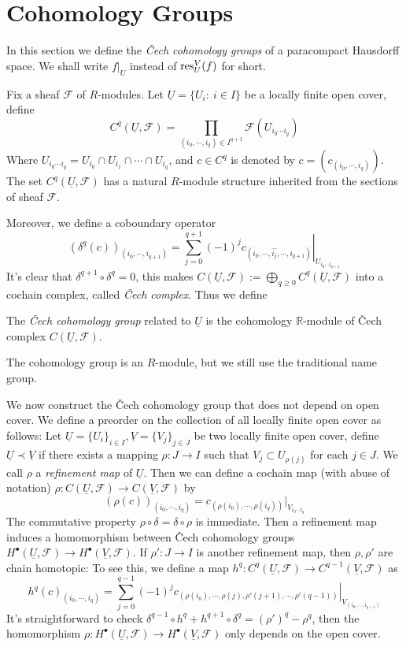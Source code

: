 \section{Cohomology Groups}

In this section we define the \emph{\v{C}ech cohomology groups} of a paracompact Hausdorff space.
We shall write $f|_U$ instead of $\operatorname{res}^V_U(f)$ for short.

Fix a sheaf $\mathcal{F}$ of $R$-modules.
Let $\underline{U}=\{U_i:\ i\in I\}$ be a locally finite open cover, define
\[C^q(\underline{U},\mathcal{F})=\prod_{(i_0,\cdots,i_q)\in I^{q+1}}\mathcal{F}(U_{i_0\cdots i_q})\]
Where $U_{i_0\cdots i_q}=U_{i_0}\cap U_{i_1}\cap\cdots\cap U_{i_q}$, and $c\in C^q$ is denoted by $c=\left(c_{(i_0,\cdots,i_q)}\right)$.
The set $C^q(\underline{U},\mathcal{F})$ has a natural $R$-module structure inherited from the sections of sheaf $\mathcal{F}$.

Moreover, we define a coboundary operator
\[(\delta^q(c))_{(i_0,\cdots,i_{q+1})}=\sum_{j=0}^{q+1}(-1)^j\left.c_{(i_0,\cdots,\widehat{i_j},\cdots,i_{q+1})}\right|_{U_{i_0\cdots i_{q+1}}}\]
It's clear that $\delta^{q+1}\circ\delta^q=0$, this makes $C(\underline{U},\mathcal{F}):=\bigoplus_{q\geq 0}C^q(\underline{U},\mathcal{F})$ into a cochain complex, called \emph{\v{C}ech complex}.
Thus we define

\begin{defn}
    The \emph{\v{C}ech cohomology group} related to $\underline{U}$ is the cohomology $\mathbb{R}$-module of \v{C}ech complex $C(\underline{U},\mathcal{F})$.
\end{defn}

The cohomology group is an $R$-module, but we still use the traditional name group.

We now construct the \v{C}ech cohomology group that does not depend on open cover.
We define a preorder on the collection of all locally finite open cover as follows:
Let $\underline{U}=\{U_i\}_{i\in I},\underline{V}=\{V_j\}_{j\in J}$ be two locally finite open cover, define $\underline{U}\prec\underline{V}$ if there exists a mapping $\rho:J\to I$ such that $V_j\subset U_{\rho(j)}$ for each $j\in J$.
We call $\rho$ a \emph{refinement map} of $\underline{U}$.
Then we can define a cochain map (with abuse of notation) $\rho:C(\underline{U},\mathcal{F})\to C(\underline{V},\mathcal{F})$ by
\[(\rho(c))_{(i_0,\cdots,i_q)}=c_{(\rho(i_0),\cdots,\rho(i_q))}|_{V_{i_0\cdots i_q}}\]
The commutative property $\rho\circ\delta=\delta\circ\rho$ is immediate.
Then a refinement map induces a homomorphism between \v{C}ech cohomology groups $H^\bullet(\underline{U},\mathcal{F})\to H^\bullet(\underline{V},\mathcal{F})$.
If $\rho':J\to I$ is another refinement map, then $\rho,\rho'$ are chain homotopic:
To see this, we define a map $h^q:C^q(\underline{U},\mathcal{F})\to C^{q-1}(\underline{V},\mathcal{F})$ as
\[h^q(c)_{(i_0,\cdots,i_q)}=\sum_{j=0}^{q-1}(-1)^j\left.c_{(\rho(i_0),\cdots,\rho(j),\rho'(j+1),\cdots,\rho'(q-1))}\right|_{V_{(i_0,\cdots,i_{q-1})}}\]
It's straightforward to check $\delta^{q-1}\circ h^q+h^{q+1}\circ\delta^q=(\rho')^q-\rho^q$, then the homomorphism $\rho:H^\bullet(\underline{U},\mathcal{F})\to H^\bullet(\underline{V},\mathcal{F})$ only depends on the open cover.

